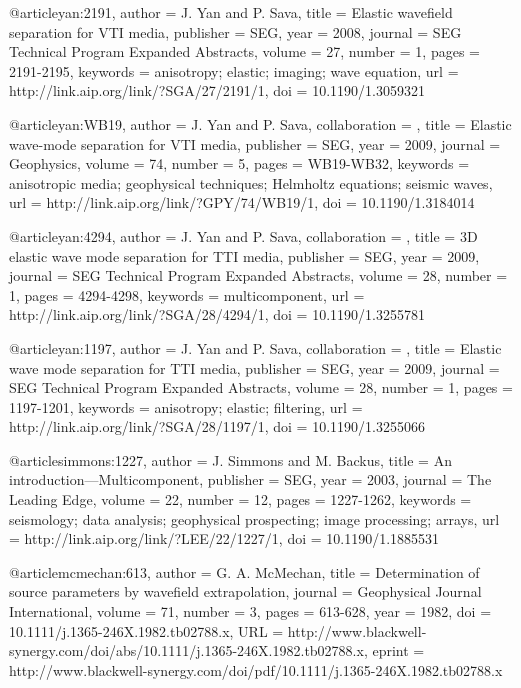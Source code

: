 {@article{yan:2191,
  author =	 {J. Yan and P. Sava},
  title =	 {Elastic wavefield separation for {VTI} media},
  publisher =	 {SEG},
  year =	 2008,
  journal =	 {SEG Technical Program Expanded Abstracts},
  volume =	 27,
  number =	 1,
  pages =	 {2191-2195},
  keywords =	 {anisotropy; elastic; imaging; wave equation},
  url =		 {http://link.aip.org/link/?SGA/27/2191/1},
  doi =		 {10.1190/1.3059321}
}




@article{yan:WB19,
author = {J. Yan and P. Sava},
collaboration = {},
title = {Elastic wave-mode separation for {VTI} media},
publisher = {SEG},
year = {2009},
journal = {Geophysics},
volume = {74},
number = {5},
pages = {WB19-WB32},
keywords = {anisotropic media; geophysical techniques; Helmholtz equations; seismic waves},
url = {http://link.aip.org/link/?GPY/74/WB19/1},
doi = {10.1190/1.3184014}
}




@article{yan:4294,
author = {J. Yan and P. Sava},
collaboration = {},
title = {3D elastic wave mode separation for {TTI} media},
publisher = {SEG},
year = {2009},
journal = {SEG Technical Program Expanded Abstracts},
volume = {28},
number = {1},
pages = {4294-4298},
keywords = {multicomponent},
url = {http://link.aip.org/link/?SGA/28/4294/1},
doi = {10.1190/1.3255781}
}







@article{yan:1197,
author = {J. Yan and P. Sava},
collaboration = {},
title = {Elastic wave mode separation for {TTI} media},
publisher = {SEG},
year = {2009},
journal = {SEG Technical Program Expanded Abstracts},
volume = {28},
number = {1},
pages = {1197-1201},
keywords = {anisotropy; elastic; filtering},
url = {http://link.aip.org/link/?SGA/28/1197/1},
doi = {10.1190/1.3255066}
}






@article{simmons:1227,
  author =	 {J. Simmons and M. Backus},
  title =	 {An introduction---{M}ulticomponent},
  publisher =	 {SEG},
  year =	 2003,
  journal =	 {The Leading Edge},
  volume =	 22,
  number =	 12,
  pages =	 {1227-1262},
  keywords =	 {seismology; data analysis; geophysical prospecting;
                  image processing; arrays},
  url =		 {http://link.aip.org/link/?LEE/22/1227/1},
  doi =		 {10.1190/1.1885531}
}

@article{mcmechan:613,
  author =	 {G. A. McMechan},
  title =	 {Determination of source parameters by wavefield
                  extrapolation},
  journal =	 {Geophysical Journal International},
  volume =	 71,
  number =	 3,
  pages =	 {613-628},
  year =	 1982,
  doi =		 {10.1111/j.1365-246X.1982.tb02788.x},
  URL =
                  {http://www.blackwell-synergy.com/doi/abs/10.1111/j.1365-246X.1982.tb02788.x},
  eprint =
                  {http://www.blackwell-synergy.com/doi/pdf/10.1111/j.1365-246X.1982.tb02788.x}
}

}
